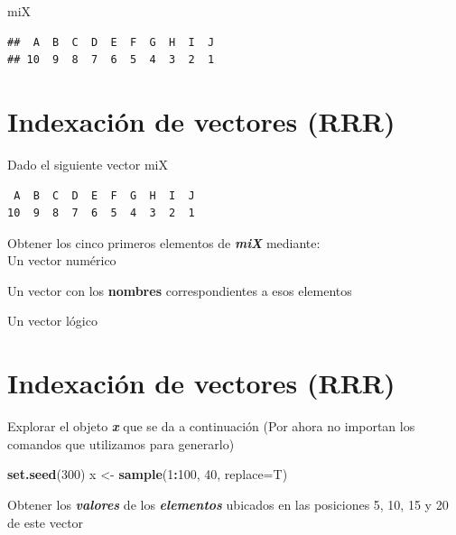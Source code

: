 \documentclass[]{book}
\newenvironment{Shaded}{\begin{snugshade}}{\end{snugshade}}
\newcommand{\DataTypeTok}[1]{\textcolor[rgb]{0.13,0.29,0.53}{#1}}
\newcommand{\DecValTok}[1]{\textcolor[rgb]{0.00,0.00,0.81}{#1}}
\newcommand{\KeywordTok}[1]{\textcolor[rgb]{0.13,0.29,0.53}{\textbf{#1}}}
\newcommand{\NormalTok}[1]{#1}
\newcommand{\OperatorTok}[1]{\textcolor[rgb]{0.81,0.36,0.00}{\textbf{#1}}}
\newcommand{\StringTok}[1]{\textcolor[rgb]{0.31,0.60,0.02}{#1}}
\begin{document}
\begin{Shaded}
\begin{Highlighting}[]
\NormalTok{miX}
\end{Highlighting}
\end{Shaded}

\begin{verbatim}
##  A  B  C  D  E  F  G  H  I  J 
## 10  9  8  7  6  5  4  3  2  1
\end{verbatim}

\hypertarget{indexaciuxf3n-de-vectores-rrr-1}{%
\section{Indexación de vectores (RRR)}\label{indexaciuxf3n-de-vectores-rrr-1}}

Dado el siguiente vector miX

\begin{verbatim}
 A  B  C  D  E  F  G  H  I  J 
10  9  8  7  6  5  4  3  2  1 
\end{verbatim}

Obtener los cinco primeros elementos de \textbf{\emph{miX}} mediante:\\

Un vector numérico

Un vector con los \textbf{nombres} correspondientes a esos elementos

Un vector lógico

\hypertarget{indexaciuxf3n-de-vectores-rrr-2}{%
\section{Indexación de vectores (RRR)}\label{indexaciuxf3n-de-vectores-rrr-2}}

Explorar el objeto \textbf{\emph{x}} que se da a continuación (Por ahora no importan los comandos que utilizamos para generarlo)

\begin{Shaded}
\begin{Highlighting}[]
  \KeywordTok{set.seed}\NormalTok{(}\DecValTok{300}\NormalTok{)}
\NormalTok{  x <-}\StringTok{ }\KeywordTok{sample}\NormalTok{(}\DecValTok{1}\OperatorTok{:}\DecValTok{100}\NormalTok{, }\DecValTok{40}\NormalTok{, }\DataTypeTok{replace=}\NormalTok{T)}
\end{Highlighting}
\end{Shaded}

Obtener los \textbf{\emph{valores}} de los \textbf{\emph{elementos}} ubicados en las posiciones 5, 10, 15 y 20 de este vector
\end{document}
